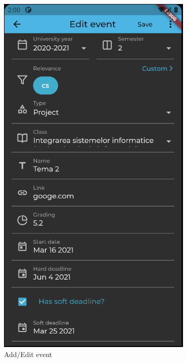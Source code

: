 \begin{figure}[!ht]
    \centering
    \begin{minipage}[b]{0.35\textwidth}
        \captionsetup{justification=centering}
        \includegraphics[width=\textwidth]{figures/ss/image6.png}
        \caption{Add/Edit event}
        \label{5:fig:faddevent}
    \end{minipage}

\end{figure}
